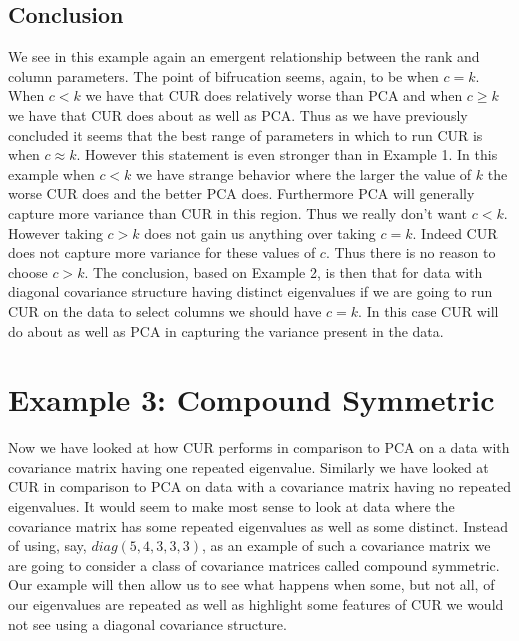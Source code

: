\documentclass{book}
\begin{document}
\subsection{Conclusion}
 
We see in this example again an emergent relationship between the rank and column parameters. The point of bifrucation seems, again, to be when $c=k$. When $c < k$ we have that CUR does relatively worse than PCA and when $c \geq k$ we have that CUR does about as well as PCA. Thus as we have previously concluded it seems that the best range of parameters in which to run CUR is when $c \approx k$. However this statement is even stronger than in Example 1. In this example when $c<k$ we have strange behavior where the larger the value of $k$ the worse CUR does and the better PCA does. Furthermore PCA will generally capture more variance than CUR in this region. Thus we really don't want $c<k$. However taking $c>k$ does not gain us anything over taking $c=k$. Indeed CUR does not capture more variance for these values of $c$. Thus there is no reason to choose $c>k$. The conclusion, based on Example 2, is then that for data with diagonal covariance structure having distinct eigenvalues if we are going to run CUR on the data to select columns we should have $c=k$. In this case CUR will do about as well as PCA in capturing the variance present in the data.  




\newpage

\section{Example 3: Compound Symmetric}

Now we have looked at how CUR performs in comparison to PCA on a data with covariance matrix having one repeated eigenvalue. Similarly we have looked at CUR in comparison to PCA on data with a covariance matrix having no repeated eigenvalues. It would seem to make most sense to look at data where the covariance matrix has some repeated eigenvalues as well as some distinct. Instead of using, say, $diag(5,4,3,3,3)$, as an example of such a covariance matrix we are going to consider a class of covariance matrices called compound symmetric. Our example will then allow us to see what happens when some, but not all, of our eigenvalues are repeated as well as highlight some features of CUR we would not see using a diagonal covariance structure. 
\end{document}
